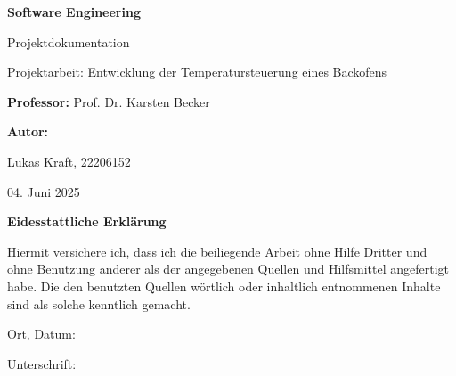 \documentclass[a4paper,12pt]{article}
\begin{document}
\begin{titlepage}
    \centering
    \vspace*{2cm}
    
    {\Huge\bfseries Software Engineering \par}
    \vspace{0.5cm}
    {\LARGE Projektdokumentation\par}
    \vspace{1.5cm}
    
    {\large Projektarbeit: Entwicklung der Temperatursteuerung eines Backofens \par}
    \vspace{2cm}
    
    \textbf{Professor:} Prof. Dr. Karsten Becker  \par
    \vspace{1.5cm}
    
    \textbf{Autor:} \par
    Lukas Kraft, 22206152 \par
    
    \vfill
    
    {\large 04. Juni 2025\par}
\end{titlepage}
\newpage

\thispagestyle{empty}

\vspace*{4cm}

\begin{center}
    {\LARGE\textbf{Eidesstattliche Erklärung}}
\end{center}

\vspace{2cm}

Hiermit versichere ich, dass ich die beiliegende Arbeit ohne Hilfe Dritter und ohne Benutzung anderer als der angegebenen Quellen und Hilfsmittel angefertigt habe. Die den benutzten Quellen wörtlich oder inhaltlich entnommenen Inhalte sind als solche kenntlich gemacht.

\vspace{3cm}

\noindent
Ort, Datum: \hrulefill

\vspace{2cm}

\noindent
Unterschrift: \hrulefill

\newpage

\tableofcontents

\newpage
\end{document}
